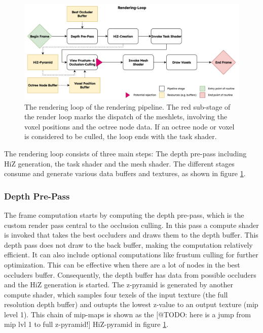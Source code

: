 \begin{figure}[h]
    \centering
    \includegraphics[width=\linewidth]{images/graphics/rendering-loop.jpg}
    \caption{The rendering loop of the rendering pipeline. The red sub-stage of the render loop marks the dispatch 
    of the meshlets, involving the voxel positions and the octree node data. If an octree node or voxel is considered 
    to be culled, the loop ends with the task shader.}
    \label{fig:pipeline-loop}
\end{figure}

\noindent
The rendering loop consists of three main steps: The depth pre-pass including \ac{HiZ} generation, the 
task shader and the mesh shader. The different stages consume and generate various data buffers 
and textures, as shown in figure \ref{fig:pipeline-loop}. 

\subsubsection*{Depth Pre-Pass} \label{subsec-depth-prepass}

The frame computation starts by computing the depth pre-pass, which is the custom render pass central 
to the occlusion culling. In this pass a compute shader is invoked that takes the best occluders and 
draws them to the depth buffer. This depth pass does not draw to the back buffer, making the computation 
relatively efficient. It can also include optional computations like frustum culling for further 
optimization. This can be effective when there are a lot of nodes in the best occluders buffer. 
Consequently, the depth buffer has data from possible occluders and the \ac{HiZ} generation is started. 
The z-pyramid is generated by another compute shader, which samples four texels of the input texture 
(the full resolution depth buffer) and outupts the lowest z-value to an output texture (mip level 1). 
This chain of mip-maps is shown as the [@TODO: here is a jump from mip lvl 1 to full z-pyramid!]
\ac{HiZ}-pyramid in figure \ref{fig:pipeline-loop}.



